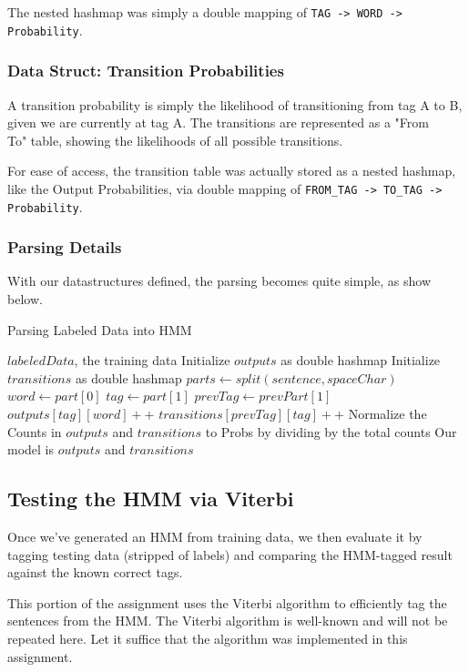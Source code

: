 \documentclass[11pt]{article}
\begin{document}
The nested hashmap was simply a double mapping of \texttt{TAG -> WORD -> Probability}.

\subsubsection{Data Struct: Transition Probabilities}
A transition probability is simply the likelihood of transitioning from tag A to B, given
we are currently at tag A.  The transitions are represented as a "From\\To"
table, showing the likelihoods of all possible transitions.

For ease of access, the transition table was actually stored as a nested hashmap, like the Output
Probabilities, via double mapping of \texttt{FROM\_TAG -> TO\_TAG -> Probability}.

\subsubsection{Parsing Details}
With our datastructures defined, the parsing becomes quite simple, as show below.

\begin{algorithm}
\caption{Parsing Labeled Data into HMM}\label{alg:parse}
\begin{algorithmic}[1]
\Require $labeledData$, the training data
\State Initialize $outputs$ as double hashmap
\State Initialize $transitions$ as double hashmap
\State $parts \gets split(sentence, spaceChar)$
\State $word \gets part[0] $
\State $tag \gets part[1] $
\State $prevTag \gets prevPart[1] $
\State $outputs[tag][word]++ $
\State $transitions[prevTag][tag]++ $
\EndFor
\EndFor
\State Normalize the Counts in $outputs$ and $transitions$ to Probs by dividing by the total counts
\State Our model is $outputs$ and $transitions$
\end{algorithmic}
\end{algorithm}


\subsection{Testing the HMM via Viterbi}
Once we've generated an HMM from training data, we then evaluate it by
tagging testing data (stripped of labels) and comparing the HMM-tagged
result against the known correct tags.

This portion of the assignment uses the Viterbi algorithm to efficiently
tag the sentences from the HMM.  The Viterbi algorithm is well-known and
will not be repeated here.  Let it suffice that the algorithm was implemented
in this assignment.
\end{document}
